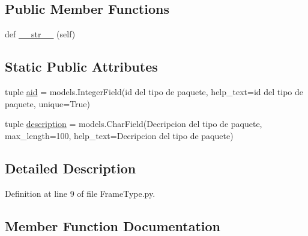 \subsection*{Public Member Functions}
\begin{DoxyCompactItemize}
\item 
def \hyperlink{class_ground_segment_1_1models_1_1_frame_type_1_1_frame_type_af343eb742f9be80f976b95b124ad66c8}{\+\_\+\+\_\+str\+\_\+\+\_\+} (self)
\end{DoxyCompactItemize}
\subsection*{Static Public Attributes}
\begin{DoxyCompactItemize}
\item 
tuple \hyperlink{class_ground_segment_1_1models_1_1_frame_type_1_1_frame_type_a01b9828a1d347c46b92322abd594b834}{aid} = models.\+Integer\+Field(\textquotesingle{}id del tipo de paquete\textquotesingle{}, help\+\_\+text=\textquotesingle{}id del tipo de paquete\textquotesingle{}, unique=True)
\item 
tuple \hyperlink{class_ground_segment_1_1models_1_1_frame_type_1_1_frame_type_a69ba7333dcea0018f17d03b6b115eedf}{description} = models.\+Char\+Field(\textquotesingle{}Decripcion del tipo de paquete\textquotesingle{}, max\+\_\+length=100, help\+\_\+text=\textquotesingle{}Decripcion del tipo de paquete\textquotesingle{})
\end{DoxyCompactItemize}


\subsection{Detailed Description}


Definition at line 9 of file Frame\+Type.\+py.



\subsection{Member Function Documentation}
\hypertarget{class_ground_segment_1_1models_1_1_frame_type_1_1_frame_type_af343eb742f9be80f976b95b124ad66c8}{}
